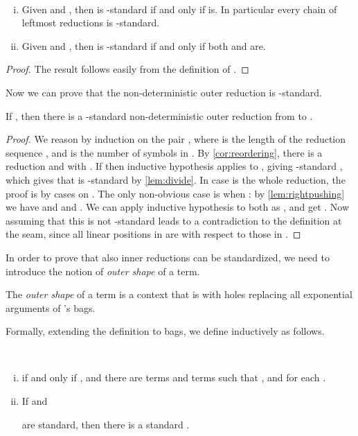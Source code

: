 \begin{lemma}\label{lem:divide}\
\begin{enumerate}[(i)]
 \item Given  and ,
then  is
 -standard if and only if  is.
 In particular every chain of leftmost reductions is -standard.
 \item Given  and ,
then  is
 -standard if and only if both  and  are.
\end{enumerate}
\end{lemma}
 \begin{proof}
 The result follows easily from the definition of .
 \end{proof}
Now we can prove that the non-deterministic outer reduction is -standard.
\begin{lemma}
  \label{lem:stdouter}
  If , then there is a -standard
  non-deterministic outer reduction from  to .
\end{lemma}
\begin{proof}
   We reason by induction on the pair , where  is the
  length of the reduction sequence , and  is
  the number of symbols in .  By \autoref{cor:reordering},
  there is a reduction  and  with .
  If  then inductive hypothesis applies to ,
  giving -standard , which
  gives that  is
  -standard by \autoref{lem:divide}.
  In case  is the
  whole reduction, the proof is by cases on .
 The only non-obvious case is when : by \autoref{lem:rightpushing} we have  and
     and . We can apply inductive hypothesis to both as , and get . Now assuming that this is not
    -standard leads to a contradiction to the definition at
    the seam, since all linear positions in  are  with respect to
    those in .
\end{proof}
In order to prove that also inner reductions can be standardized, we need to introduce the notion of 
{\em outer shape} of a term.
\begin{definition}
  The \emph{outer shape}  of a term  is a context that
  is  with holes replacing all exponential arguments of 's
  bags.

  Formally, extending the definition to bags, we define
   inductively as follows.
  
  
\end{definition}
\begin{property}\label{lem:inner_outer}\
\begin{enumerate}[(i)]
\item \label{lem:inner_shape}  if and only if , and there are 
  terms  and  terms  such that
  ,  and
   for each .
\item \label{lem:outer_shape_std}
  If  and
  
  are standard, then there is a standard 
  .
\end{enumerate}
\end{property}
